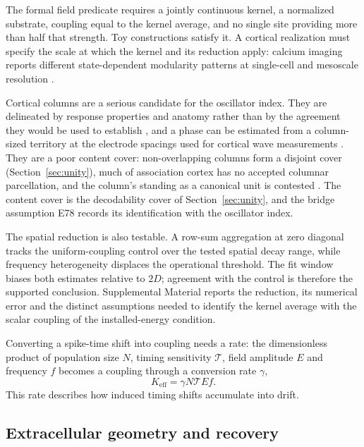 \documentclass[12pt]{article}
\renewcommand{\cite}[1]{\citep{#1}}
\begin{document}
The formal field predicate requires a jointly continuous kernel, a normalized substrate, coupling equal to the kernel average, and no single site providing more than half that strength. Toy constructions satisfy it. A cortical realization must specify the scale at which the kernel and its reduction apply: calcium imaging reports different state-dependent modularity patterns at single-cell and mesoscale resolution \cite{kiyooka2026}.

Cortical columns are a serious candidate for the oscillator index. They are delineated by response properties and anatomy rather than by the agreement they would be used to establish \cite{mountcastle1997}, and a phase can be estimated from a column-sized territory at the electrode spacings used for cortical wave measurements \cite{townsend2015}. They are a poor content cover: non-overlapping columns form a disjoint cover (Section~\ref{sec:unity}), much of association cortex has no accepted columnar parcellation, and the column's standing as a canonical unit is contested \cite{horton2005,rakic2008}. The content cover is the decodability cover of Section~\ref{sec:unity}, and the bridge assumption E78 records its identification with the oscillator index.

The spatial reduction is also testable. A row-sum aggregation at zero diagonal tracks the uniform-coupling control over the tested spatial decay range, while frequency heterogeneity displaces the operational threshold. The fit window biases both estimates relative to $2D$; agreement with the control is therefore the supported conclusion. Supplemental Material reports the reduction, its numerical error and the distinct assumptions needed to identify the kernel average with the scalar coupling of the installed-energy condition.

Converting a spike-time shift into coupling needs a rate: the dimensionless product of population size $N$, timing sensitivity $\mathcal{T}$, field amplitude $E$ and frequency $f$ becomes a coupling through a conversion rate $\gamma$,
\begin{equation}
 K_{\mathrm{eff}}=\gamma N \mathcal{T} E f.
 \label{eq:keff}
\end{equation}
This rate describes how induced timing shifts accumulate into drift.

\subsection{Extracellular geometry and recovery}
\end{document}
